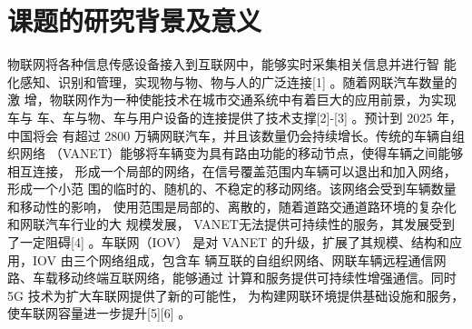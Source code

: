 \section{课题的研究背景及意义}\label{section1-1}
\textcolor[RGB]{202,12,22}{物联网将各种信息传感设备接入到互联网中，能够实时采集相关信息并进行智
能化感知、识别和管理，实现物与物、物与人的广泛连接[1]
。随着网联汽车数量的激
增，物联网作为一种使能技术在城市交通系统中有着巨大的应用前景，为实现车与
车、车与物、车与用户设备的连接提供了技术支撑[2]-[3]
。预计到 2025 年，中国将会
有超过 2800 万辆网联汽车，并且该数量仍会持续增长。传统的车辆自组织网络
（VANET）能够将车辆变为具有路由功能的移动节点，使得车辆之间能够相互连接，
形成一个局部的网络，在信号覆盖范围内车辆可以退出和加入网络，形成一个小范
围的临时的、随机的、不稳定的移动网络。该网络会受到车辆数量和移动性的影响，
使用范围是局部的、离散的，随着道路交通道路环境的复杂化和网联汽车行业的大
规模发展， VANET无法提供可持续性的服务，其发展受到了一定阻碍[4]
。车联网（IOV）
是对 VANET 的升级，扩展了其规模、结构和应用，IOV 由三个网络组成，包含车
辆互联的自组织网络、网联车辆远程通信网路、车载移动终端互联网络，能够通过
计算和服务提供可持续性增强通信。同时 5G 技术为扩大车联网提供了新的可能性，
为构建网联环境提供基础设施和服务，使车联网容量进一步提升[5][6]
。}
